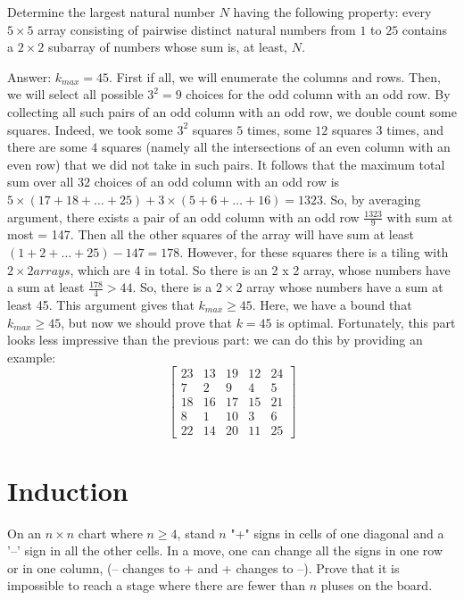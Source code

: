 \begin{example} [BMOSL 2019]
Determine the largest natural number $ N $ having the following property: every $ 5\times 5 $ array consisting of pairwise distinct natural numbers from $ 1 $ to $ 25 $ contains a $ 2\times 2 $ subarray of numbers whose sum is, at least, $ N. $
\end{example}
\sol
Answer: $k_{max} = 45$.
First if all, we will enumerate the columns and rows. Then, we will select all possible $3^2 = 9$ choices for the odd column with an odd row.
By collecting all such pairs of an odd column with an odd row, we double count some squares. Indeed, we took some $3^2$ squares $5$ times, some $12$ squares $3$ times, and there are
some $4$ squares (namely all the intersections of an even column with an even row) that we did not take in such pairs.
It follows that the maximum total sum over all $32$ choices of an odd column with an odd row is
$5\times (17+18+\dots +25) + 3 \times (5+6+ \dots +16) = 1323$.
So, by averaging argument, there exists a pair of an odd column with an odd row $\frac{1323}{9}$ with sum at most = 147. 
Then all the other squares of the array will have sum at least
$(1+2+ \dots +25) - 147 = 178$. However, for these squares there is a tiling with $2 \times 2 arrays$, which are 4 in total. So there is an 2 x 2 array, whose numbers have a sum at least $\frac{178}{4} > 44$. So, there is a $2 \times 2$ array whose numbers have a sum at least 45. This argument gives that $k_{max} \geq 45$.
Here, we have a bound that $k_{max} \geq 45$, but now we should prove that $k=45$ is optimal. Fortunately, this part looks less impressive than the previous part: we can do this by providing an example:
\[
\begin{bmatrix}
23 & 13 & 19 & 12 & 24 \\
7 & 2 & 9 & 4 & 5 \\
18 & 16 & 17 & 15 & 21 \\
8 & 1 & 10 & 3 & 6 \\
22 & 14 & 20 & 11 & 25
\end{bmatrix}
\]


\section{Induction}

\begin{example}
    On an $n\times n$ chart where $n\geq 4$, stand $n$ "+" signs in cells of one diagonal and a '--' sign in all the other cells. In a move, one can change all the signs in one row or in one column, (-- changes to + and + changes to --). Prove that it is impossible to reach a stage where there are fewer than $n$ pluses on the board.
\end{example}

